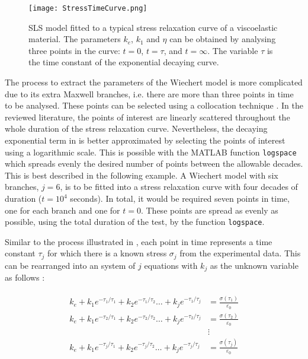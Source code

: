 \begin{figure}[htb!]
	\centering
    \texttt{[image: StressTimeCurve.png]}
    \caption{SLS model fitted to a typical stress relaxation curve of a viscoelastic material. The parameters $k_e$, $k_1$ and $\eta$ can be obtained by analysing three points in the curve: $t=0$, $t=\tau$, and $t=\infty$. The variable $\tau$ is the time constant of the exponential decaying curve.}
    \label{fig:stressTimeCurve}
\end{figure}

The process to extract the parameters of the Wiechert model is more complicated due to its extra Maxwell branches, i.e. there are more than three points in time to be analysed. These points can be selected using a collocation technique \cite{roylance2001engineering,machiraju2006viscoelastic}. In the reviewed literature, the points of interest are linearly scattered throughout the whole duration of the stress relaxation curve. Nevertheless, the decaying exponential term in  is better approximated by selecting the points of interest using a logarithmic scale. This is possible with the MATLAB function \texttt{logspace} which spreads evenly the desired number of points between the allowable decades. 
This is best described in the following example. A Wiechert model with six branches, $j=6$, is to be fitted into a stress relaxation curve with four decades of duration ($t=10^4$ seconds). In total, it would be required seven points in time, one for each branch and one for $t=0$. These points are spread as evenly as possible, using the total duration of the test, by the function \texttt{logspace}. 

Similar to the process illustrated in , each point in time represents a time constant $\tau_j$ for which there is a known stress $\sigma_j$ from the experimental data. This can be rearranged into an system of $j$ equations with $k_j$ as the unknown variable as follows \cite{machiraju2006viscoelastic}: 

\begin{align}
\begin{split}
k_e + k_1e^{-\tau_1/\tau_1} 	 +k_2e^{-\tau_1/\tau_2}	\dots 	 +k_je^{-\tau_1/\tau_j} 	&= \frac{\sigma(\tau_1)}{\varepsilon_0 }
\\
k_e + k_1e^{-\tau_2/\tau_1} 	 +k_2e^{-\tau_2/\tau_2}	\dots 	 +k_je^{-\tau_2/\tau_j} 	&= \frac{\sigma(\tau_2)}{\varepsilon_0 }
\\
 & \vdots
\\
k_e + k_1e^{-\tau_j/\tau_1} 	 +k_2e^{-\tau_j/\tau_2}	\dots 	 +k_je^{-\tau_j/\tau_j} 	&= \frac{\sigma(\tau_j)}{\varepsilon_0 }
\end{split}
\label{eq12}
\end{align}

